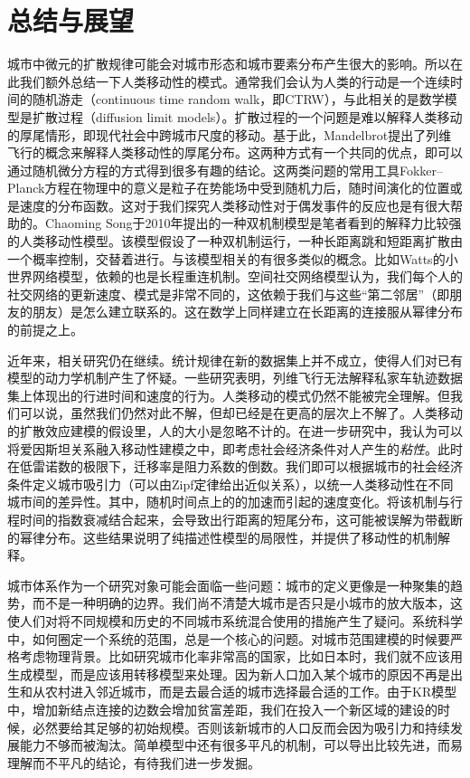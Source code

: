 \chapter{总结与展望}

城市中微元的扩散规律可能会对城市形态和城市要素分布产生很大的影响。所以在此我们额外总结一下人类移动性的模式。通常我们会认为人类的行动是一个连续时间的随机游走（continuous time random walk，即CTRW），与此相关的是数学模型是扩散过程（diffusion limit models）。扩散过程的一个问题是难以解释人类移动的厚尾情形，即现代社会中跨城市尺度的移动。基于此，Mandelbrot提出了列维飞行的概念\cite{doi:10.1142/S0218127408021877}来解释人类移动性的厚尾分布。这两种方式有一个共同的优点，即可以通过随机微分方程的方式得到很多有趣的结论。这两类问题的常用工具Fokker–Planck方程在物理中的意义是粒子在势能场中受到随机力后，随时间演化的位置或是速度的分布函数。这对于我们探究人类移动性对于偶发事件的反应也是有很大帮助的。Chaoming Song于2010年提出的一种双机制模型\cite{song2010modelling}是笔者看到的解释力比较强的人类移动性模型。该模型假设了一种双机制运行，一种长距离跳和短距离扩散由一个概率控制，交替着进行。与该模型相关的有很多类似的概念。比如Watts的小世界网络模型\cite{watts1998collective}，依赖的也是长程重连机制。空间社交网络模型\cite{PhysRevX.4.011008}认为，我们每个人的社交网络的更新速度、模式是非常不同的，这依赖于我们与这些“第二邻居”（即朋友的朋友）是怎么建立联系的。这在数学上同样建立在长距离的连接服从幂律分布的前提之上。

近年来，相关研究仍在继续。统计规律在新的数据集上并不成立，使得人们对已有模型的动力学机制产生了怀疑。一些研究\cite{GallottiA}表明，列维飞行无法解释私家车轨迹数据集上体现出的行进时间和速度的行为。人类移动的模式仍然不能被完全理解。但我们可以说，虽然我们仍然对此不解，但却已经是在更高的层次上不解了。人类移动的扩散效应建模的假设里，人的大小是忽略不计的。在进一步研究中，我认为可以将爱因斯坦关系\cite{doi:10.1002/andp.18551700105}融入移动性建模之中，即考虑社会经济条件对人产生的\emph{粘性}。此时在低雷诺数的极限下，迁移率是阻力系数的倒数。我们即可以根据城市的社会经济条件定义城市吸引力（可以由Zipf定律给出近似关系），以统一人类移动性在不同城市间的差异性。其中，随机时间点上的的加速而引起的速度变化。将该机制与行程时间的指数衰减结合起来，会导致出行距离的短尾分布，这可能被误解为带截断的幂律分布。这些结果说明了纯描述性模型的局限性，并提供了移动性的机制解释。

城市体系作为一个研究对象可能会面临一些问题：城市的定义更像是一种聚集的趋势，而不是一种明确的边界。我们尚不清楚大城市是否只是小城市的放大版本，这使人们对将不同规模和历史的不同城市系统混合使用的措施产生了疑问\cite{Depersin2317}。系统科学中，如何圈定一个系统的范围，总是一个核心的问题。对城市范围建模的时候要严格考虑物理背景。比如研究城市化率非常高的国家，比如日本时，我们就不应该用生成模型，而是应该用转移模型来处理。因为新人口加入某个城市的原因不再是出生和从农村进入邻近城市，而是去最合适的城市选择最合适的工作。由于KR模型中，增加新结点连接的边数会增加贫富差距，我们在投入一个新区域的建设的时候，必然要给其足够的初始规模。否则该新城市的人口反而会因为吸引力和持续发展能力不够而被淘汰。简单模型中还有很多平凡的机制，可以导出比较先进，而易理解而不平凡的结论，有待我们进一步发掘。

